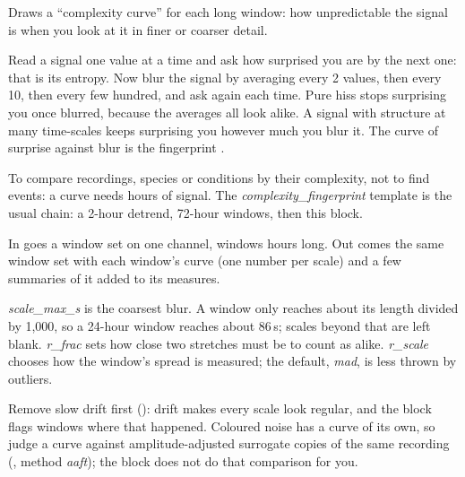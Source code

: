 Draws a ``complexity curve'' for each long window: how unpredictable the signal is when you
look at it in finer or coarser detail.

\begin{plainterms}
Read a signal one value at a time and ask how surprised you are by the next one: that is its
entropy. Now blur the signal by averaging every 2 values, then every 10, then every few
hundred, and ask again each time. Pure hiss stops surprising you once blurred, because the
averages all look alike. A signal with structure at many time-scales keeps surprising you
however much you blur it. The curve of surprise against blur is the fingerprint
\citep{costa2005multiscale}.
\end{plainterms}

To compare recordings, species or conditions by their complexity, not to find events: a
curve needs hours of signal. The \emph{complexity\_fingerprint} template is the usual chain:
a 2-hour detrend, 72-hour windows, then this block.

In goes a window set on one channel, windows hours long. Out comes the same window set with
each window's curve (one number per scale) and a few summaries of it added to its measures.

\emph{scale\_max\_s} is the coarsest blur. A window only reaches about its length divided by
1{,}000, so a 24-hour window reaches about 86\,s; scales beyond that are left blank.
\emph{r\_frac} sets how close two stretches must be to count as alike. \emph{r\_scale} chooses
how the window's spread is measured; the default, \emph{mad}, is less thrown by outliers.

Remove slow drift first (): drift makes every scale look
regular, and the block flags windows where that happened. Coloured noise has a curve of its
own, so judge a curve against amplitude-adjusted surrogate copies of the same recording
(, method \emph{aaft}); the block does not do that
comparison for you.
